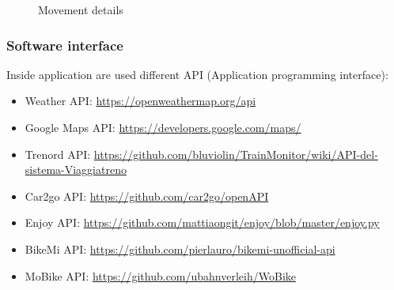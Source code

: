 	\clearpage
	\begin{figure}[!h]
		\centering
		\begin{minipage}[b]{0.65\textwidth}
			\caption{Movement details}
		\end{minipage}
	\end{figure}
	\clearpage
	
\subsubsection{Software interface}
Inside application are used different API (Application programming interface):
\begin{itemize}
	\item Weather API: \href{url}{https://openweathermap.org/api}
	\item Google Maps API: \href{url}{https://developers.google.com/maps/}
	\item Trenord API: \href{url}{https://github.com/bluviolin/TrainMonitor/wiki/API-del-sistema-Viaggiatreno}
	\item Car2go API: \href{url}{https://github.com/car2go/openAPI}
	\item Enjoy API: \href{url}{https://github.com/mattiaongit/enjoy/blob/master/enjoy.py}
	\item BikeMi API: \href{url}{https://github.com/pierlauro/bikemi-unofficial-api}
	\item MoBike API: \href{url}{https://github.com/ubahnverleih/WoBike}
\end{itemize}
